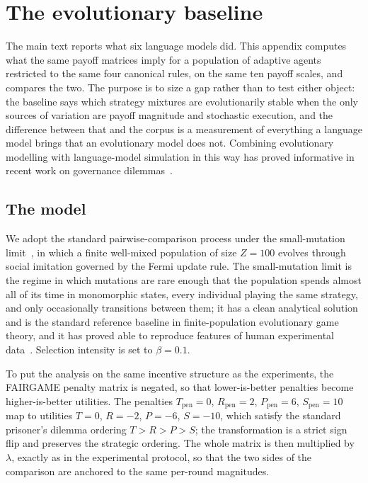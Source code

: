 \documentclass[openacc]{rsproca_new}
\newcommand{\lam}{\lambda}
\begin{document}


\FloatBarrier


\section{The evolutionary baseline}\label{appendix:egt}

The main text reports what six language models did. This appendix computes what
the same payoff matrices imply for a population of adaptive agents restricted
to the same four canonical rules, on the same ten payoff scales, and compares
the two. The purpose is to size a gap rather than to test either object:
the baseline says which strategy mixtures are evolutionarily stable when the
only sources of variation are payoff magnitude and stochastic execution, and
the difference between that and the corpus is a measurement of everything a
language model brings that an evolutionary model does not. Combining
evolutionary modelling with language-model simulation in this way has proved
informative in recent work on governance
dilemmas~\cite{balabanova2025media,buscemi2025llms}.

\subsection{The model}\label{appendix:egt_model}

We adopt the standard pairwise-comparison process under the small-mutation
limit~\cite{sigmund:2010bo,han_when_2021,nowak2004emergence,liu2020evolutionary},
in which a finite well-mixed population of size $Z = 100$ evolves through
social imitation governed by the Fermi update rule. The small-mutation limit is
the regime in which mutations are rare enough that the population spends almost
all of its time in monomorphic states, every individual playing the same
strategy, and only occasionally transitions between them; it has a clean
analytical solution and is the standard reference baseline in finite-population
evolutionary game theory, and it has proved able to reproduce features of human
experimental data~\cite{rand2013evolution,zisis2015generosity}. Selection
intensity is set to $\beta = 0.1$.

To put the analysis on the same incentive structure as the experiments, the
FAIRGAME penalty matrix is negated, so that lower-is-better penalties become
higher-is-better utilities. The penalties $T_{\text{pen}} = 0$,
$R_{\text{pen}} = 2$, $P_{\text{pen}} = 6$, $S_{\text{pen}} = 10$ map to
utilities $T = 0$, $R = -2$, $P = -6$, $S = -10$, which satisfy the standard
prisoner's dilemma ordering $T > R > P > S$; the transformation is a strict
sign flip and preserves the strategic ordering. The whole matrix is then
multiplied by $\lam$, exactly as in the experimental protocol, so that the two
sides of the comparison are anchored to the same per-round magnitudes.
\end{document}
